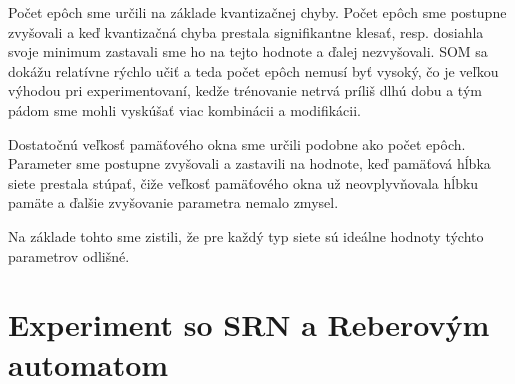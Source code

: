 
Počet epôch sme určili na základe kvantizačnej chyby.
Počet epôch sme postupne zvyšovali a keď kvantizačná chyba prestala signifikantne klesať, resp. dosiahla 
svoje minimum zastavali sme ho na tejto hodnote a ďalej nezvyšovali. SOM sa dokážu relatívne rýchlo učiť a 
teda počet epôch nemusí byť vysoký, čo je veľkou výhodou pri experimentovaní, kedže trénovanie netrvá príliš dlhú dobu
a tým pádom sme mohli vyskúšať viac kombinácii a modifikácii.

Dostatočnú veľkosť pamäťového okna sme určili podobne ako počet epôch. Parameter sme postupne zvyšovali
a zastavili na hodnote, keď pamäťová hĺbka siete prestala stúpať, čiže veľkosť pamäťového okna už
neovplyvňovala hĺbku pamäte a ďalšie zvyšovanie parametra nemalo zmysel. 

Na základe tohto sme zistili, že pre každý typ siete sú ideálne hodnoty týchto parametrov odlišné.


\section{Experiment so SRN a Reberovým automatom}



